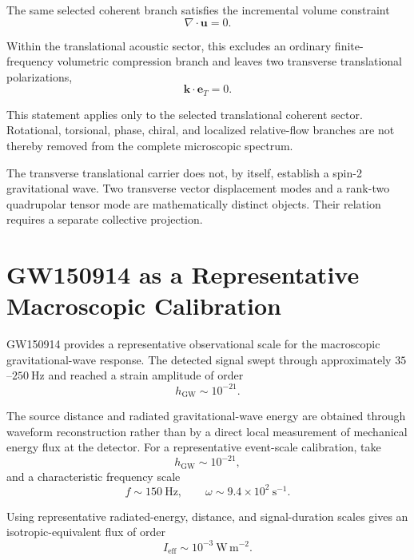 The same selected coherent branch satisfies the incremental volume constraint
\begin{equation}
    \nabla\cdot\mathbf{u} = 0.
\end{equation}

Within the translational acoustic sector, this excludes an ordinary finite-frequency volumetric compression branch and leaves two transverse translational polarizations,
\begin{equation}
    \mathbf{k}\cdot\mathbf{e}_T = 0.
\end{equation}

This statement applies only to the selected translational coherent sector. Rotational, torsional, phase, chiral, and localized relative-flow branches are not thereby removed from the complete microscopic spectrum.

The transverse translational carrier does not, by itself, establish a spin-2 gravitational wave. Two transverse vector displacement modes and a rank-two quadrupolar tensor mode are mathematically distinct objects. Their relation requires a separate collective projection.

\section{GW150914 as a Representative Macroscopic Calibration}

GW150914 provides a representative observational scale for the macroscopic gravitational-wave response. The detected signal swept through approximately $35$--$250\ \mathrm{Hz}$ and reached a strain amplitude of order
\begin{equation}
    h_{\mathrm{GW}} \sim 10^{-21}.
\end{equation}

The source distance and radiated gravitational-wave energy are obtained through waveform reconstruction rather than by a direct local measurement of mechanical energy flux at the detector. For a representative event-scale calibration, take
\begin{equation}
    h_{\mathrm{GW}} \sim 10^{-21},
\end{equation}
and a characteristic frequency scale
\begin{equation}
    f \sim 150\ \mathrm{Hz}, \qquad \omega \sim 9.4\times10^2\ \mathrm{s^{-1}}.
\end{equation}

Using representative radiated-energy, distance, and signal-duration scales gives an isotropic-equivalent flux of order
\begin{equation}
    I_{\mathrm{eff}} \sim 10^{-3}\ \mathrm{W\,m^{-2}}.
\end{equation}

